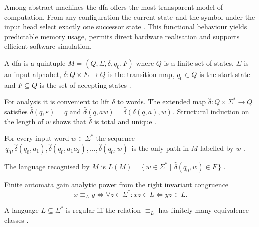 Among abstract machines the \gls{dfa} offers the most transparent model
of computation.  From any configuration the current state and the symbol
under the input head select exactly one successor state
\cite{hopcroft2001introduction}.  This functional behaviour yields predictable
memory usage, permits direct hardware realisation and supports efficient
software simulation.

\begin{definition}\label{def:dfa}
A \gls{dfa} is a quintuple
$M=(Q,\Sigma,\delta,q_{0},F)$ where
$Q$ is a finite set of states,
$\Sigma$ is an input alphabet,
$\delta\colon Q{\times}\Sigma\to Q$ is the transition map,
$q_{0}\in Q$ is the start state and
$F\subseteq Q$ is the set of accepting states
\cite{hopcroft2001introduction}.
\end{definition}

For analysis it is convenient to lift $\delta$ to words.  The extended
map $\hat{\delta}\colon Q{\times}\Sigma^{\ast}\to Q$ satisfies
$\hat{\delta}(q,\varepsilon)=q$ and
$\hat{\delta}(q,aw)=\hat{\delta}(\delta(q,a),w)$.  Structural induction
on the length of $w$ shows that $\hat{\delta}$ is total and unique
\cite{hopcroft2001introduction}.

\begin{proposition}\label{prop:dfa-path}
For every input word $w\in\Sigma^{\ast}$ the sequence
$\,q_{0},
\hat{\delta}(q_{0},a_{1}),
\hat{\delta}(q_{0},a_{1}a_{2}),
\dots,
\hat{\delta}(q_{0},w)\,$
is the only path in $M$ labelled by $w$
\cite{hopcroft2001introduction}.
\end{proposition}

\begin{definition}\label{def:dfa-lang}
The language recognised by $M$ is
$L(M)=\{\,w\in\Sigma^{\ast}\mid \hat{\delta}(q_{0},w)\in F\,\}$
\cite{hopcroft2001introduction}.
\end{definition}

Finite automata gain analytic power from the right invariant congruence
\[x\equiv_{L}y \Longleftrightarrow
  \forall z\in\Sigma^{\ast}\colon
  xz\in L \Leftrightarrow yz\in L.\]

\begin{theorem}\label{thm:mn-dfa}
A language $L\subseteq\Sigma^{\ast}$ is regular
iff the relation $\equiv_{L}$ has finitely many equivalence classes
\cite{nerode1958linear}.
\end{theorem}

